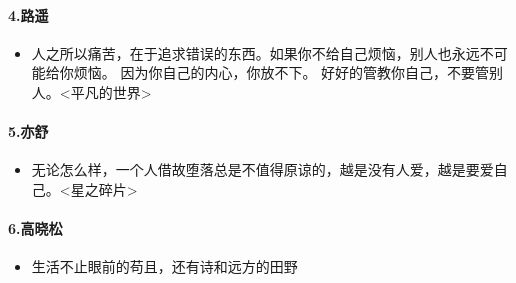 \documentclass[UTF8,a4paper,8pt]{ctexart}
\begin{document}
 \paragraph{4.路遥}
 \begin{itemize}
 	\item 人之所以痛苦，在于追求错误的东西。如果你不给自己烦恼，别人也永远不可能给你烦恼。 因为你自己的内心，你放不下。 好好的管教你自己，不要管别人。<平凡的世界>
 \end{itemize}
 
 
 \paragraph{5.亦舒}
 \begin{itemize}
 	\item  无论怎么样，一个人借故堕落总是不值得原谅的，越是没有人爱，越是要爱自己。<星之碎片>
 \end{itemize}
 
 \paragraph{6.高晓松}
 \begin{itemize}
 	\item  生活不止眼前的苟且，还有诗和远方的田野
 \end{itemize}
 
\end{document}
